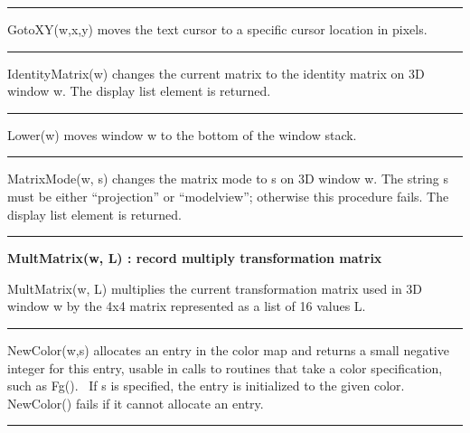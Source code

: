 \bigskip\hrule\vspace{0.1cm}

\noindent
\textsf{GotoXY(w,x,y)} moves the text cursor to a specific cursor
location in pixels.

\bigskip\hrule\vspace{0.1cm}

\noindent
\textsf{IdentityMatrix(w)} changes the current matrix to the identity
matrix on 3D window \textsf{w}. The display list element is returned. 

\bigskip\hrule\vspace{0.1cm}

\noindent
\textsf{Lower(w)} moves window \textsf{w} to the bottom of the window
stack.

\bigskip\hrule\vspace{0.1cm}

\noindent
\textsf{MatrixMode(w, s)} changes the matrix mode to \textsf{s} on 3D
window \textsf{w}. The string \textsf{s} must be either
\textsf{{\textquotedblleft}projection{\textquotedblright}} or
\textsf{{\textquotedblleft}modelview{\textquotedblright}}; otherwise
this procedure fails. The display list element is returned.

\bigskip\hrule\vspace{0.1cm}
\noindent
{\bf MultMatrix(w, L) : record \hfill multiply transformation matrix}

\noindent
\textsf{MultMatrix(w, L)} multiplies the current transformation matrix
used in 3D window w by the 4x4 matrix represented as a list of 16
values L.

\bigskip\hrule\vspace{0.1cm}

\noindent
\textsf{NewColor(w,s)} allocates an entry in the color map and returns a
small negative integer for this entry, usable in calls to routines that
take a color specification, such as \textsf{Fg()}. \ If \textsf{s} is
specified, the entry is initialized to the given color.
\textsf{NewColor()} fails if it cannot allocate an entry.

\bigskip\hrule\vspace{0.1cm}


